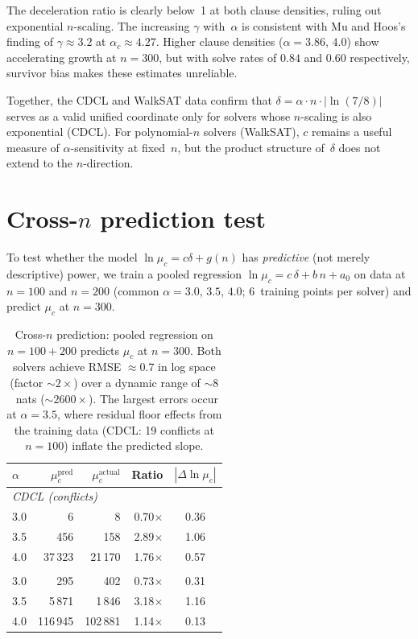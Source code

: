\documentclass[11pt,a4paper]{article}
\newcommand{\mc}{\mu_c}
\begin{document}
The deceleration ratio is clearly below~1 at both clause densities,
ruling out exponential $n$-scaling.
The increasing $\gamma$ with~$\alpha$ is consistent with
Mu and Hoos's~\cite{MuHoos2015} finding of
$\gamma \approx 3.2$ at $\alpha_c \approx 4.27$.
Higher clause densities ($\alpha = 3.86$, $4.0$) show
accelerating growth at $n = 300$, but with solve rates of
$0.84$ and $0.60$ respectively, survivor bias makes these
estimates unreliable.

Together, the CDCL and WalkSAT data confirm that
$\delta = \alpha \cdot n \cdot |\!\ln(7/8)|$ serves as
a valid unified coordinate only for solvers whose
$n$-scaling is also exponential (CDCL).
For polynomial-$n$ solvers (WalkSAT), $c$ remains a useful
measure of $\alpha$-sensitivity at fixed~$n$, but the
product structure of~$\delta$ does not extend to the
$n$-direction.


\section{Cross-$n$ prediction test}
\label{app:prediction}

To test whether the model $\ln \mc = c\delta + g(n)$ has
\emph{predictive} (not merely descriptive) power,
we train a pooled regression
$\ln \mc = c\,\delta + b\,n + a_0$
on data at $n = 100$ and $n = 200$
(common $\alpha = 3.0$, $3.5$, $4.0$;
6~training points per solver)
and predict $\mc$ at $n = 300$.

\begin{table}[h]
\centering
\begin{tabular}{lrrrc}
\toprule
$\alpha$ & $\mc^{\text{pred}}$ & $\mc^{\text{actual}}$
  & Ratio & $|\Delta\ln\mc|$ \\
\midrule
\multicolumn{5}{l}{\textit{CDCL (conflicts)}} \\
3.0  & 6       & 8       & 0.70$\times$  & 0.36 \\
3.5  & 456     & 158     & 2.89$\times$  & 1.06 \\
4.0  & 37\,323 & 21\,170 & 1.76$\times$  & 0.57 \\
\addlinespace
\multicolumn{5}{l}{\textit{WalkSAT (flips)}} \\
3.0  & 295     & 402     & 0.73$\times$  & 0.31 \\
3.5  & 5\,871  & 1\,846  & 3.18$\times$  & 1.16 \\
4.0  & 116\,945 & 102\,881 & 1.14$\times$ & 0.13 \\
\bottomrule
\end{tabular}
\caption{Cross-$n$ prediction: pooled regression on
$n = 100{+}200$ predicts $\mc$ at $n = 300$.
Both solvers achieve RMSE $\approx 0.7$ in log space
(factor $\sim\! 2\times$) over a dynamic range of
$\sim\! 8$~nats ($\sim\! 2600\times$).
The largest errors occur at $\alpha = 3.5$,
where residual floor effects from the training data
(CDCL: 19 conflicts at $n = 100$) inflate the
predicted slope.}
\label{tab:prediction}
\end{table}
\end{document}
